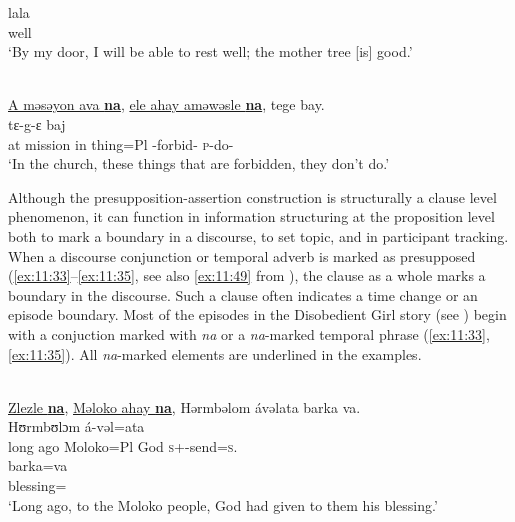       \medskip
\gll lala\\
     well\\
\glt  ‘By my door, I will be able to rest well; the mother tree [is] good.’
\z

\ea \label{ex:11:32}
\\
\underline{A  məsəyon  ava  \textbf{na}},  \underline{ele  ahay  aməwəsle  \textbf{na}},  tege  bay.  \\
\gll  {}                   tɛ-g-ɛ    baj  \\
      at  mission  in  {\PSP}  thing=Pl  {\DEP}-forbid-{\CL}  {\PSP}  \textsc{p}-do-{\CL}  {\NEG}\\
\glt  ‘In the church, these things that are forbidden, they don’t do.’
\z

Although the presupposition-assertion construction is structurally a clause level phenomenon, it can function in information structuring at the proposition level both to mark a boundary in a discourse, to set topic, and in participant tracking. When a discourse conjunction or temporal adverb is marked as presupposed (\ref{ex:11:33}--\ref{ex:11:35}, see also \ref{ex:11:49} from ), the clause as a whole marks a boundary in the discourse. Such a clause often indicates a time change or an episode boundary. Most of the episodes in the Disobedient Girl story (see ) begin with a conjuction marked with \textit{na}  or a \textit{na}-marked temporal phrase (\ref{ex:11:33}, \ref{ex:11:35}).  All \textit{na}-marked elements are underlined in the examples. 

\ea \label{ex:11:33}
\\
\underline{Zlezle  \textbf{na}}, \underline{Məloko  ahay  \textbf{na}},  Hərmbəlom  ávəlata  barka  va.  \\
\gll  {}       Hʊrmbʊlɔm    á-vəl=ata             \\   
      {long ago}  {\PSP}  Moloko=Pl   {\PSP}  God    \textsc{s}+{\IFV}-send=\textsc{s}.{\IO}  \\  
      
      \medskip
\gll  barka=va\\
blessing={\PRF}\\
\glt  ‘Long ago, to the Moloko people, God had given to them his blessing.’
\z

